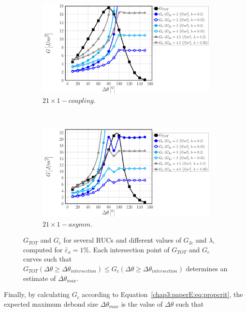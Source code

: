 \begin{figure}[!htbp]
    \begin{subfigure}[b]{0.45\textwidth}
        \includegraphics[width=\textwidth]{paperE/vf60-dsize-S10A0vk.pdf}
        \caption{$21\times 1-coupling$.}\label{chap3:paperE:fig:debondsize-g}
    \end{subfigure} ~
    \begin{subfigure}[b]{0.45\textwidth}
        \includegraphics[width=\textwidth]{paperE/vf60-dsize-S10A0asymm.pdf}
        \caption{$21\times 1-asymm$.}\label{chap3:paperE:fig:debondsize-h}
    \end{subfigure}

\caption{$G_{TOT}$ and $G_{c}$ for several RUCs and different values of $G_{Ic}$ and $\lambda$, computed for $\bar{\varepsilon}_{x}=1\%$. Each intersection point of $G_{TOT}$ and $G_{c}$ curves such that $G_{TOT}\left(\Delta\theta\geq\Delta\theta_{intersection}\right)\leq G_{c}\left(\Delta\theta\geq\Delta\theta_{intersection}\right)$ determines an estimate of $\Delta\theta_{max}$.}\label{chap3:paperE:fig:debondsize}
\end{figure}

Finally, by calculating $G_{c}$ according to Equation~\ref{chap3:paperE:eq:propcrit}, the expected maximum debond size $\Delta\theta_{max}$ is the value of $\Delta\theta$ such that

